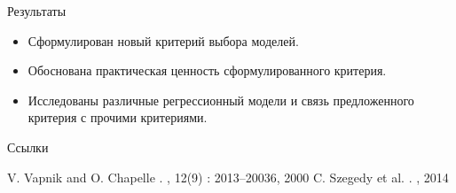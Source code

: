 \documentclass{beamer}
\begin{document}
\begin{frame}{Результаты}
  \begin{itemize}
    \item Сформулирован новый критерий выбора моделей.
    \item Обоснована практическая ценность сформулированного критерия.
    \item Исследованы различные регрессионный модели и связь предложенного критерия с прочими критериями.
  \end{itemize}
\end{frame}

\begin{frame}[allowframebreaks]{Ссылки}
  \begin{thebibliography}{10}    
  \beamertemplatearticlebibitems
    V. Vapnik and O. Chapelle
    .
    , 12(9) : 2013--20036, 2000
    C. Szegedy et al.
    .
    , 2014
  \end{thebibliography}
\end{frame}
\end{document}
